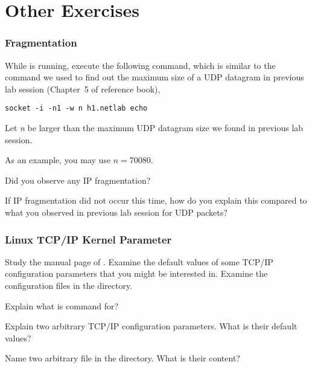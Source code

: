 \documentclass{../UTNetLab}
\begin{document}
\part{Other Exercises}
\section{Fragmentation}
While  is running, execute the following command, which is similar to the command we used to find out the maximum size of a UDP datagram in previous lab session (Chapter~5 of reference book),
\begin{lstlisting}[emph={n, h1,netlab}]
socket -i -n1 -w n h1.netlab echo
    \end{lstlisting}
Let \textit{n} be larger than the maximum UDP datagram size we found in previous lab session.

As an example, you may use $n = 70080$.

\begin{report}
    \item Did you observe any IP fragmentation?

    \item If IP fragmentation did not occur this time, how do you explain this compared to what you observed in previous lab session for UDP packets?
\end{report}

\section{Linux TCP/IP Kernel Parameter}
Study the manual page of .
Examine the default values of some TCP/IP configuration parameters that you might be interested in.
Examine the configuration files in the  directory.

\begin{report}
    \item Explain what is  command for?

    \item Explain two arbitrary TCP/IP configuration parameters.
    What is their default values?

    \item Name two arbitrary file in the  directory.
    What is their content?
\end{report}
\end{document}
